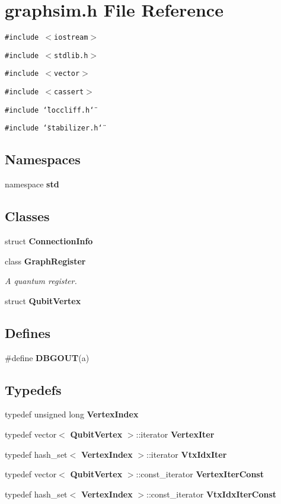 \section{graphsim.h File Reference}
\label{graphsim_8h}
{\tt \#include $<$iostream$>$}\par
{\tt \#include $<$stdlib.h$>$}\par
{\tt \#include $<$vector$>$}\par
{\tt \#include $<$cassert$>$}\par
{\tt \#include \char`\"{}loccliff.h\char`\"{}}\par
{\tt \#include \char`\"{}stabilizer.h\char`\"{}}\par
\subsection*{Namespaces}
\begin{CompactItemize}
\item 
namespace {\bf std}
\end{CompactItemize}
\subsection*{Classes}
\begin{CompactItemize}
\item 
struct {\bf Connection\-Info}
\item 
class {\bf Graph\-Register}
\begin{CompactList}\small\item\em A quantum register. \item\end{CompactList}\item 
struct {\bf Qubit\-Vertex}
\end{CompactItemize}
\subsection*{Defines}
\begin{CompactItemize}
\item 
\#define {\bf DBGOUT}(a)\label{graphsim_8h_a0}

\end{CompactItemize}
\subsection*{Typedefs}
\begin{CompactItemize}
\item 
typedef unsigned long {\bf Vertex\-Index}
\item 
typedef vector$<$ {\bf Qubit\-Vertex} $>$::iterator {\bf Vertex\-Iter}
\item 
typedef hash\_\-set$<$ {\bf Vertex\-Index} $>$::iterator {\bf Vtx\-Idx\-Iter}
\item 
typedef vector$<$ {\bf Qubit\-Vertex} $>$::const\_\-iterator {\bf Vertex\-Iter\-Const}
\item 
typedef hash\_\-set$<$ {\bf Vertex\-Index} $>$::const\_\-iterator {\bf Vtx\-Idx\-Iter\-Const}
\end{CompactItemize}


